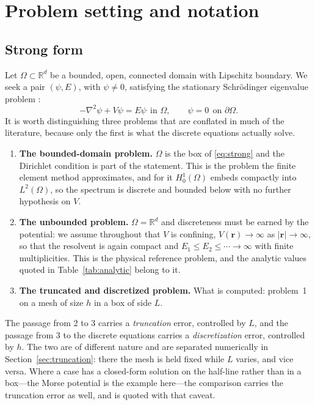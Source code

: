 \documentclass[pdflatex,sn-mathphys-num]{sn-jnl}
\theoremstyle{thmstyleone}%
\theoremstyle{thmstyletwo}%
\theoremstyle{thmstylethree}%
\begin{document}
\section{Problem setting and notation}\label{sec:formulation}

\subsection{Strong form}

Let $\Omega \subset \mathbb{R}^d$ be a bounded, open, connected domain with
Lipschitz boundary. We seek a pair $(\psi, E)$, with $\psi \neq 0$, satisfying
the stationary Schr\"odinger eigenvalue problem
\cite{courant1953,datta2005}:
%
\begin{equation}\label{eq:strong}
  -\nabla^2 \psi + V\psi = E\psi \ \ \text{in } \Omega,
  \qquad
  \psi = 0 \ \ \text{on } \partial\Omega .
\end{equation}
%
It is worth distinguishing three problems that are conflated in much of the
literature, because only the first is what the discrete equations actually solve.

\begin{enumerate}
  \item \textbf{The bounded-domain problem.} $\Omega$ is the box of
        \eqref{eq:strong} and the Dirichlet condition is part of the statement.
        This is the problem the finite element method approximates, and for it
        $H^1_0(\Omega)$ embeds compactly into $L^2(\Omega)$, so the spectrum is
        discrete and bounded below with no further hypothesis on $V$.
  \item \textbf{The unbounded problem.} $\Omega = \mathbb{R}^d$ and discreteness
        must be earned by the potential: we assume throughout that $V$ is
        confining, $V(\mathbf{r}) \to \infty$ as $|\mathbf{r}| \to \infty$, so
        that the resolvent is again compact and $E_1 \le E_2 \le \cdots \to
        \infty$ with finite multiplicities. This is the physical reference
        problem, and the analytic values quoted in Table~\ref{tab:analytic}
        belong to it.
  \item \textbf{The truncated and discretized problem.} What is computed:
        problem~1 on a mesh of size $h$ in a box of side $L$.
\end{enumerate}

The passage from 2 to 3 carries a \emph{truncation} error, controlled by $L$,
and the passage from 3 to the discrete equations carries a \emph{discretization}
error, controlled by $h$. The two are of different nature and are separated
numerically in Section~\ref{sec:truncation}: there the mesh is held fixed while
$L$ varies, and vice versa. Where a case has a closed-form solution on the
half-line rather than in a box---the Morse potential is the example here---the
comparison carries the truncation error as well, and is quoted with that caveat.
\end{document}
